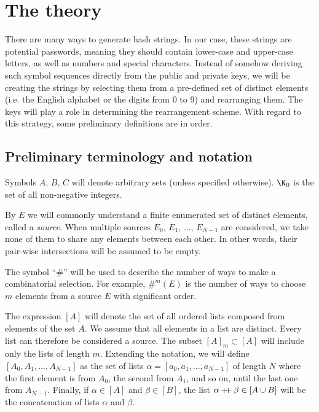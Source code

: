 \documentclass[12pt, a4paper]{article}
\newcommand{\dop}{\mathbin{{+}\hspace{-1mm}{+}}}
\begin{document}
\section{The theory}

There are many ways to generate hash strings. In our case, these strings are potential passwords, meaning they should contain lower-case and upper-case letters, as well as numbers and special characters. Instead of somehow deriving such symbol sequences directly from the public and private keys, we will be creating the strings by selecting them from a pre-defined set of distinct elements (i.e. the English alphabet or the digits from 0 to 9) and rearranging them. The keys will play a role in determining the rearrangement scheme. With regard to this strategy, some preliminary definitions are in order.

\subsection{Preliminary terminology and notation}

Symbols $ A $, $ B $, $ C $ will denote arbitrary sets (unless specified otherwise). $ \N_0 $ is the set of all non-negative integers.

By $ E $ we will commonly understand a finite enumerated set of distinct elements, called a \emph{source}. When multiple sources $ E_0 $, $ E_1 $, ..., $ E_{N-1} $ are considered, we take none of them to share any elements between each other. In other words, their pair-wise intersections will be assumed to be empty.

The symbol ``$ \# $'' will be used to describe the number of ways to make a combinatorial selection. For example, $ \#^m(E) $ is the number of ways to choose $ m $ elements from a source $ E $ with significant order.

The expression $ [A] $ will denote the set of all ordered lists composed from elements of the set $ A $. We assume that all elements in a list are distinct. Every list can therefore be considered a source. The subset $ [A]_m \subset [A] $ will include only the lists of length $ m $. Extending the notation, we will define $ [A_0, A_1, ..., A_{N-1}] $ as the set of lists $ \alpha = [a_0, a_1, ..., a_{N-1}] $ of length $ N $ where the first element is from $ A_0 $, the second from $ A_1 $, and so on, until the last one from $ A_{N-1} $. Finally, if $ \alpha \in [A] $ and $ \beta \in [B] $, the list $ \alpha \dop \beta \in [A \cup B] $ will be the concatenation of lists $ \alpha $ and $ \beta $.
\end{document}
